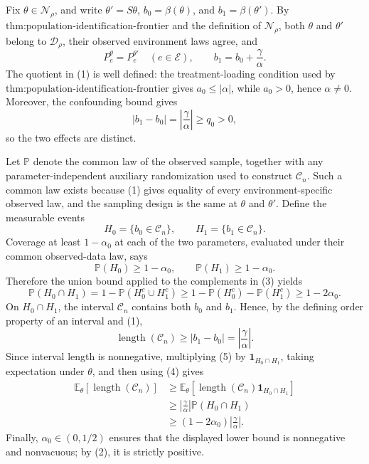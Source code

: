 Fix \(\theta\in\mathcal N_\rho\), and write \(\theta'=S\theta\), \(b_0=\beta(\theta)\), and \(b_1=\beta(\theta')\).  By \(\text{thm:population-identification-frontier}\) and the definition of \(\mathcal N_\rho\), both \(\theta\) and \(\theta'\) belong to \(\mathcal D_\rho\), their observed environment laws agree, and
\[
 P_e^{\theta}=P_e^{\theta'}\quad(e\in\mathcal E),
 \qquad
 b_1=b_0+\frac{\gamma}{\alpha}.
 \tag{1}
\]
The quotient in (1) is well defined: the treatment-loading condition used by \(\text{thm:population-identification-frontier}\) gives \(a_0\leq |\alpha|\), while \(a_0>0\), hence \(\alpha\neq0\).  Moreover, the confounding bound gives
\[
 \left|b_1-b_0\right|=\left|\frac{\gamma}{\alpha}\right|\geq q_0>0,
 \tag{2}
\]
so the two effects are distinct.

Let \(\mathbb P\) denote the common law of the observed sample, together with any parameter-independent auxiliary randomization used to construct \(\mathcal C_n\).  Such a common law exists because (1) gives equality of every environment-specific observed law, and the sampling design is the same at \(\theta\) and \(\theta'\).  Define the measurable events
\[
 H_0=\{b_0\in\mathcal C_n\},
 \qquad
 H_1=\{b_1\in\mathcal C_n\}.
\]
Coverage at least \(1-\alpha_0\) at each of the two parameters, evaluated under their common observed-data law, says
\[
 \mathbb P(H_0)\geq1-\alpha_0,
 \qquad
 \mathbb P(H_1)\geq1-\alpha_0.
 \tag{3}
\]
Therefore the union bound applied to the complements in (3) yields
\[
 \mathbb P(H_0\cap H_1)
 =1-\mathbb P(H_0^c\cup H_1^c)
 \geq1-\mathbb P(H_0^c)-\mathbb P(H_1^c)
 \geq1-2\alpha_0.
 \tag{4}
\]
On \(H_0\cap H_1\), the interval \(\mathcal C_n\) contains both \(b_0\) and \(b_1\).  Hence, by the defining order property of an interval and (1),
\[
 \operatorname{length}(\mathcal C_n)
 \geq |b_1-b_0|
 =\left|\frac{\gamma}{\alpha}\right|.
 \tag{5}
\]
Since interval length is nonnegative, multiplying (5) by \(\mathbf 1_{H_0\cap H_1}\), taking expectation under \(\theta\), and then using (4) gives
\[
 \begin{aligned}
 \mathbb E_\theta\!\left[\operatorname{length}(\mathcal C_n)\right]
 &\geq
 \mathbb E_\theta\!\left[
   \operatorname{length}(\mathcal C_n)\mathbf 1_{H_0\cap H_1}
 \right]\\
 &\geq
 \left|\frac{\gamma}{\alpha}\right|
 \mathbb P(H_0\cap H_1)\\
 &\geq
 (1-2\alpha_0)\left|\frac{\gamma}{\alpha}\right|.
 \end{aligned}
\]
Finally, \(\alpha_0\in(0,1/2)\) ensures that the displayed lower bound is nonnegative and nonvacuous; by (2), it is strictly positive.
